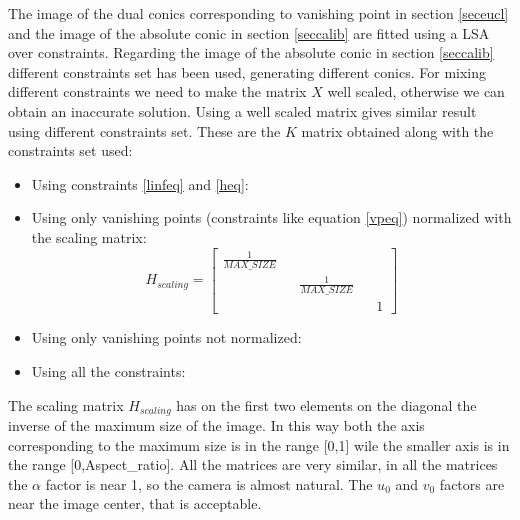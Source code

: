 \documentclass[11pt, oneside]{article}   	%
\begin{document}
The image of the dual conics corresponding to vanishing point in section \ref{seceucl} and the image of the absolute conic in section \ref{seccalib} are fitted using a LSA over constraints.
Regarding the image of the absolute conic in section \ref{seccalib} different constraints set has been used, generating different conics. For mixing different constraints we need to make the matrix $X$ well scaled, otherwise we can obtain an inaccurate solution. 
Using a well scaled matrix gives similar result using different constraints set. 
These are the $K$ matrix obtained along with the constraints set used:
\begin{itemize}
\item Using constraints \ref{linfeq} and \ref{heq}:
\item Using only vanishing points (constraints like equation \ref{vpeq}) normalized with the scaling matrix:
$$
H_{scaling} = \begin{bmatrix}
\frac{1}{MAX\_SIZE} && && \\
&& \frac{1}{MAX\_SIZE} &&  \\
&& && 1
\end{bmatrix}
$$
\item Using only vanishing points not normalized:
\item Using all the constraints:
\end{itemize}

The scaling matrix $H_{scaling}$ has on the first two elements on the diagonal the inverse of the maximum size of the image. In this way both the axis corresponding to the maximum size is in the range [0,1] wile the smaller axis is in the range [0,Aspect\_ratio].
All the matrices are very similar, in all the matrices the $\alpha$ factor is near 1, so the camera is almost natural. The $u_0$ and $v_0$ factors are near the image center, that is acceptable.  
\end{document}
